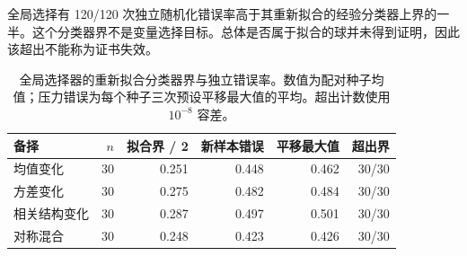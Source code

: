 \documentclass[11pt,a4paper]{article}
\begin{document}
全局选择有 120/120 次独立随机化错误率高于其重新拟合的经验分类器上界的一半。这个分类器界不是变量选择目标。总体是否属于拟合的球并未得到证明，因此该超出不能称为证书失效。
\begin{table}[htbp]\centering\small\setlength{\tabcolsep}{3.5pt}
\caption{全局选择器的重新拟合分类器界与独立错误率。数值为配对种子均值；压力错误为每个种子三次预设平移最大值的平均。超出计数使用 $10^{-8}$ 容差。}\label{tab:head}
\begin{tabularx}{\linewidth}{@{}p{22mm}rrrrr@{}}
\toprule 备择 & $n$ & 拟合界 / 2 & 新样本错误 & 平移最大值 & 超出界 \\
\midrule
均值变化 & 30 & 0.251 & 0.448 & 0.462 & 30/30 \\
方差变化 & 30 & 0.275 & 0.482 & 0.484 & 30/30 \\
相关结构变化 & 30 & 0.287 & 0.497 & 0.501 & 30/30 \\
对称混合 & 30 & 0.248 & 0.423 & 0.426 & 30/30 \\
\bottomrule\end{tabularx}\end{table}
\end{document}
